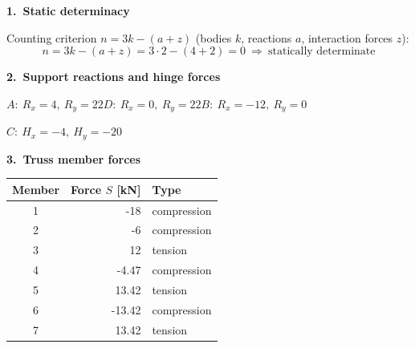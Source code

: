 \documentclass[a4paper,11pt]{article}
\begin{document}
\par\medskip\textbf{1.\ Static determinacy}\par Counting criterion $n=3k-(a+z)$ (bodies $k$, reactions $a$, interaction forces $z$):
\[ n=3k-(a+z)=3\cdot2-(4+2)=0\ \Rightarrow\ \text{statically determinate} \]
\par\medskip\textbf{2.\ Support reactions and hinge forces}\par
$A:\ R_x=4,\ R_y=22$\quad $D:\ R_x=0,\ R_y=22$\quad $B:\ R_x=-12,\ R_y=0$\par $C:\ H_x=-4,\ H_y=-20$
\par\medskip\textbf{3.\ Truss member forces}\par
\begin{center}\renewcommand{\arraystretch}{1.1}\begin{tabular}{c r l}
\toprule
Member & Force $S$ [kN] & Type \\
\midrule
  1 & -18 & compression \\
  2 & -6 & compression \\
  3 & 12 & tension \\
  4 & -4.47 & compression \\
  5 & 13.42 & tension \\
  6 & -13.42 & compression \\
  7 & 13.42 & tension \\
\bottomrule
\end{tabular}\end{center}
\end{document}
